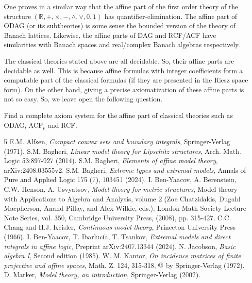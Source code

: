 \documentclass[12pt]{article}
\def\Rn{\mathbb R}
\begin{document}
One proves in a similar way that the affine part of the first order theory of
the structure $(\Rn,+,\times,-,\wedge,\vee,0,1)$ has quantifier-elimination.
The affine part of ODAG (or its subtheories) is some sense the bounded version of the theory of Banach lattices.
Likewise, the affine parts of DAG and RCF/ACF have similarities with Banach spaces
and real/complex Banach algebras respectively.

The classical theories stated above are all decidable. So, their affine parts are decidable as well.
This is because affine formulas with integer coefficients form a computable part of the
classical formulas (if they are presented in the Riesz space form).
On the other hand, giving a precise axiomatization of these affine parts is not so easy.
So, we leave open the following question.
\bigskip

 Find a complete axiom system for the affine part of classical theories
such as ODAG, ACF$_p$ and RCF.


\begin{thebibliography}{5}
 E.M. Alfsen, \emph{Compact convex sets and boundary integrals}, Springer-Verlag (1971).
 S.M. Bagheri, \emph{Linear model theory for Lipschitz structures}, Arch. Math. Logic 53:897-927 (2014).
 S.M. Bagheri, \emph{Elements of affine model theory}, arXiv:2408.03555v2.
 S.M. Bagheri, \textit{Extreme types and extremal models}, Annals of Pure and Applied Logic 175 (7), 103451 (2024).
 I. Ben-Yaacov, A. Berenstein, C.W. Henson, A. Usvyatsov,
\textit{Model theory for metric structures}, Model theory with Applications
to Algebra and Analysis, volume 2 (Zoe Chatzidakis, Dugald Macpherson,
Anand Pillay, and Alex Wilkie, eds.), London Math Society Lecture Note Series,
vol. 350, Cambridge University Press, (2008), pp. 315-427.
 C.C. Chang and H.J. Keisler, \textit{Continuous model theory}, Princeton University Press (1966).
 I. Ben-Yaacov, T. Ibarluc\'{i}a, T. Tsankov,
\textit{Extremal models and direct integrals in affine logic}, Preprint arXiv:2407.13344 (2024).
 N. Jacobson, \emph{Basic algebra I}, Second edition (1985).
 W. M. Kantor, \emph{On incidence matrices of finite projective and affine spaces},
Math. Z. 124, 315-318, $\copyright$ by Springer-Verlag (1972).
 D. Marker, \emph{Model theory, an introduction}, Springer-Verlag (2002).
\end{thebibliography}
\end{document}
